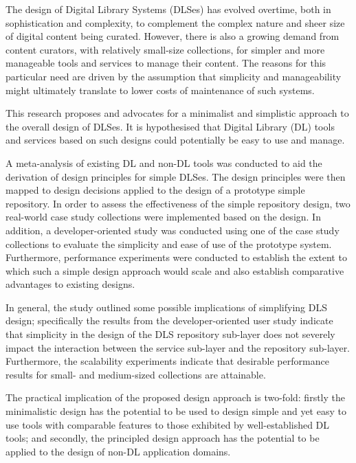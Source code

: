 % 

%
% 

% 
% 
% 
The design of Digital Library Systems (DLSes) has evolved overtime, both in sophistication and complexity, to complement the complex nature and sheer size of digital content being curated. However, there is also a growing demand from content curators, with relatively small-size collections, for simpler and more manageable tools and services to manage their content. The reasons for this particular need are driven by the assumption that simplicity and manageability might ultimately translate to lower costs of maintenance of such systems.

This research proposes and advocates for a minimalist and simplistic approach to the overall design of DLSes. It is hypothesised that Digital Library (DL) tools and services based on such designs could potentially be easy to use and manage.

% 

% 
A meta-analysis of existing DL and non-DL tools was conducted to aid the derivation of design principles for simple DLSes. The design principles were then mapped to design decisions applied to the design of a prototype simple repository. In order to assess the effectiveness of the simple repository design, two real-world case study collections were implemented based on the design. In addition, a developer-oriented study was conducted using one of the case study collections to evaluate the simplicity and ease of use of the prototype system. Furthermore, performance experiments were conducted to establish the extent to which such a simple design approach would scale and also establish comparative advantages to existing designs.

% 
% 


% 
In general, the study outlined some possible implications of simplifying DLS design; specifically the results from the developer-oriented user study indicate that simplicity in the design of the DLS repository sub-layer does not severely impact the interaction between the service sub-layer and the repository sub-layer. Furthermore, the scalability experiments indicate that desirable performance results for small- and medium-sized collections are attainable.

The practical implication of the proposed design approach is two-fold: firstly the minimalistic design has the potential to be used to design simple and yet easy to use tools with comparable features to those exhibited by well-established DL tools; and secondly, the principled design approach has the potential to be applied to the design of non-DL application domains.